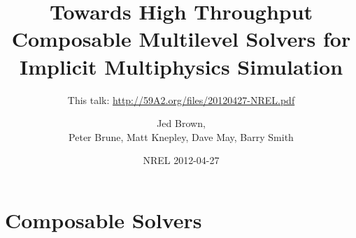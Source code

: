 \documentclass{beamer}
\title{Towards High Throughput Composable Multilevel Solvers for Implicit Multiphysics Simulation}
\subtitle{This talk: \url{http://59A2.org/files/20120427-NREL.pdf}}
\author{Jed Brown\inst{1},\\
Peter Brune\inst{1}, Matt Knepley\inst{2}, Dave May\inst{3}, Barry Smith\inst{1}}
\institute
{
  \inst{1}{Mathematics and Computer Science Division, Argonne National Laboratory} \\
  \inst{2}{Computation Institute, University of Chicago} \\
  \inst{3}{ETH Z\"urich}
}
\date{NREL 2012-04-27}
\begin{document}
\lstset{language=C}
\normalem

\begin{frame}
  \titlepage
\end{frame}



\section{Composable Solvers}











\end{document}
